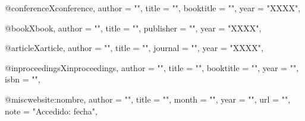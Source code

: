 @conference{Xconference,
    author          = "",
    title           = "",
    booktitle       = "",
    year            = "XXXX",
}

@book{Xbook,
    author          = "",
    title           = "",
    publisher       = "",
    year            = "XXXX",
}

@article{Xarticle,
    author          = "",
    title           = "",
    journal         = "",
    year            = "XXXX",
}

@inproceedings{Xinproceedings,
	author		    = "",
	title		    = "",
	booktitle	    = "",
	year		    = "",
	isbn            = "",
}

@misc{website:nombre,
      author        = "",
      title         = "",
      month         = "",
      year          = "",
      url           = "",
      note          = "Accedido: fecha",
}

